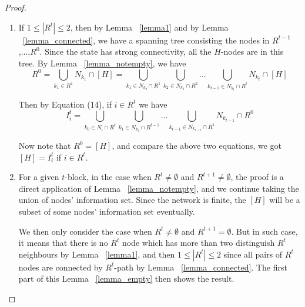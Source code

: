\documentclass[12pt]{article}
\theoremstyle{remark}
\theoremstyle{remark}
\begin{document}
\begin{proof}
\begin{enumerate}
\item If $1\leq |R^t| \leq 2$, then by Lemma ~\ref{lemma1} and by Lemma ~\ref{lemma_connected}, we have a spanning tree consisting the nodes in $R^{t-1}$,...,$R^0$. Since the state has strong connectivity, all the $H$-nodes are in this tree. By Lemma ~\ref{lemma_notempty}, we have
\[R^0=\bigcup_{k_1\in R^1} N_{k_1}\cap [H]=\bigcup_{k_1\in N_{k_2}\cap R^1} \bigcup_{k_2\in N_{k_3}\cap R^2}...\bigcup_{k_{t-1}\in N_{k_t}\cap R^t}N_{k_t}\cap [H]\]

Then by Equation (14), if $i\in R^t$ we have 
\[I^t_i=\bigcup_{k_0\in N_i\cap R^{t}}\bigcup_{k_1\in N_{k_0}\cap R^{t-1}}...\bigcup_{k_{t-1}\in N_{k_{t-2}}\cap R^{1}}N_{k_{t-1}}\cap R^0\]

Now note that $R^0=[H]$, and compare the above two equations, we got $[H]= I^t_{i}$ if $i\in R^t$.

\item For a given $t$-block, in the case when $R^t\neq \emptyset$ and $R^{t+1}\neq \emptyset$, the proof is a direct application of Lemma ~\ref{lemma_notempty}, and we continue taking the union of nodes' information set. Since the network is finite, the $[H]$ will be a subset of some nodes' information set eventually.

We then only consider the case when $R^t\neq \emptyset$ and $R^{t+1}= \emptyset$. But in such case, it means that there is no $R^{t}$ node which has more than two distinguish $R^{t}$ neighbours by Lemma ~\ref{lemma1}, and then $1\leq |R^t| \leq 2$ since all pairs of $R^t$ nodes are connected by $R^t$-path by Lemma ~\ref{lemma_connected}. The first part of this Lemma ~\ref{lemma_empty} then shows the result. 
\end{enumerate}

\end{proof}
\end{document}
